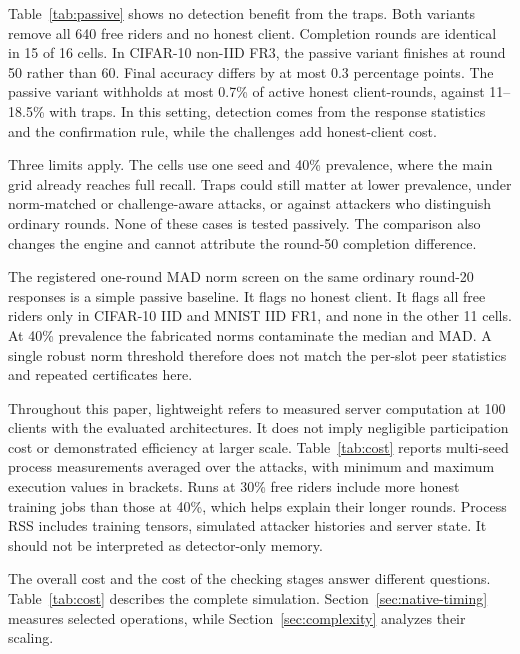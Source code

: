 \documentclass[journal]{IEEEtran}
\makeatletter
\renewcommand{\subsection}{\@startsection{subsection}{2}{\z@}{1.5ex}{0.7ex}{\normalfont\normalsize\itshape}}
\makeatother
\begin{document}
Table~\ref{tab:passive} shows no detection benefit from the traps. Both
variants remove all 640 free riders and no honest client. Completion
rounds are identical in 15 of 16 cells. In CIFAR-10 non-IID FR3, the
passive variant finishes at round 50 rather than 60. Final accuracy
differs by at most 0.3 percentage points. The passive variant withholds
at most 0.7\% of active honest client-rounds, against 11--18.5\% with
traps. In this setting, detection comes from the response statistics and
the confirmation rule, while the challenges add honest-client cost.


Three limits apply. The cells use one seed and 40\% prevalence, where
the main grid already reaches full recall. Traps could still matter at
lower prevalence, under norm-matched or challenge-aware attacks, or
against attackers who distinguish ordinary rounds. None of these cases
is tested passively. The comparison also changes the engine and cannot
attribute the round-50 completion difference.

The registered one-round MAD norm screen on the same ordinary round-20
responses is a simple passive baseline. It flags no honest client. It
flags all free riders only in CIFAR-10 IID and MNIST IID FR1, and none in
the other 11 cells. At 40\% prevalence the fabricated norms contaminate
the median and MAD. A single robust norm threshold therefore does not
match the per-slot peer statistics and repeated certificates here.

\subsection{Execution Time and Memory}
Throughout this paper, lightweight refers to measured server computation
at 100 clients with the evaluated architectures. It does not imply
negligible participation cost or demonstrated efficiency at larger scale.
Table~\ref{tab:cost} reports multi-seed process measurements averaged over
the attacks, with minimum and maximum execution values in brackets.
Runs at 30\% free riders include more honest training jobs than those at
40\%, which helps explain their longer rounds. Process RSS includes
training tensors, simulated attacker histories and server state.
It should not be interpreted as detector-only memory.

The overall cost and the cost of the checking stages answer different
questions. Table~\ref{tab:cost} describes the complete simulation.
Section~\ref{sec:native-timing} measures selected operations, while
Section~\ref{sec:complexity} analyzes their scaling.

\end{document}
